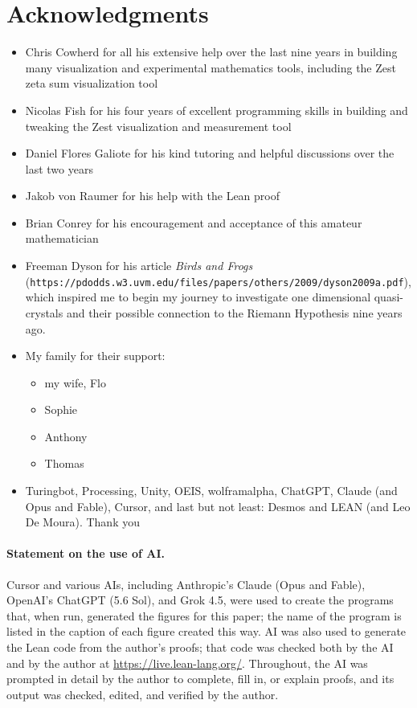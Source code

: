 \documentclass[11pt]{article}
\theoremstyle{definition}
\begin{document}
\section*{Acknowledgments}
\begin{itemize}
  \item Chris Cowherd for all his extensive help over the last nine years in building many visualization and experimental mathematics tools, including the Zest zeta sum visualization tool
  \item Nicolas Fish for his four years of excellent programming skills in building and tweaking the Zest visualization and measurement tool
  \item Daniel Flores Galiote for his kind tutoring and helpful discussions over the last two years
  \item Jakob von Raumer for his help with the Lean proof
  \item Brian Conrey for his encouragement and acceptance of this amateur mathematician
  \item Freeman Dyson for his article {\it Birds and Frogs} \\(\texttt {\small https://pdodds.w3.uvm.edu/files/papers/others/2009/dyson2009a.pdf}), which inspired me to begin my journey to investigate one dimensional quasi-crystals and their possible connection to the Riemann Hypothesis nine years ago.
  \item My family for their support:
    \begin{itemize}
      \item my wife, Flo
      \item Sophie
      \item Anthony
      \item Thomas
    \end{itemize}
  \item Turingbot, Processing, Unity, OEIS, wolframalpha, ChatGPT, Claude (and Opus and Fable), Cursor, and last but not least: Desmos and LEAN (and Leo De Moura).  Thank you
\end{itemize}

\paragraph{Statement on the use of AI.}
Cursor and various AIs, including Anthropic's Claude (Opus and Fable),
OpenAI's ChatGPT (5.6 Sol), and Grok 4.5, were used to create the programs
that, when run, generated the figures for this paper; the name of the
program is listed in the caption of each figure created this way. AI was
also used to generate the Lean code from the author's proofs; that code was
checked both by the AI and by the author at
\url{https://live.lean-lang.org/}. Throughout, the AI was prompted in
detail by the author to complete, fill in, or explain proofs, and its
output was checked, edited, and verified by the author.
\end{document}
